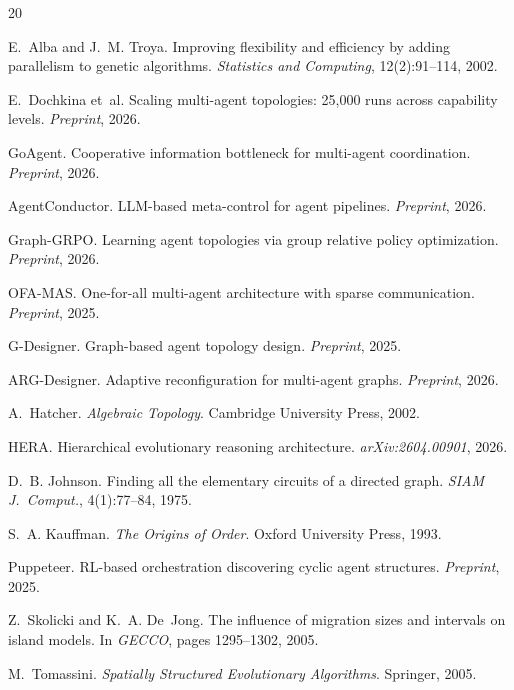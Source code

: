 \documentclass[10pt,twocolumn]{article}
\begin{document}

\begin{thebibliography}{20}

E.~Alba and J.~M. Troya.
\newblock Improving flexibility and efficiency by adding parallelism to genetic
  algorithms.
\newblock \emph{Statistics and Computing}, 12(2):91--114, 2002.

E.~Dochkina et~al.
\newblock Scaling multi-agent topologies: 25,000 runs across capability levels.
\newblock \emph{Preprint}, 2026.

GoAgent.
\newblock Cooperative information bottleneck for multi-agent coordination.
\newblock \emph{Preprint}, 2026.

AgentConductor.
\newblock LLM-based meta-control for agent pipelines.
\newblock \emph{Preprint}, 2026.

Graph-GRPO.
\newblock Learning agent topologies via group relative policy optimization.
\newblock \emph{Preprint}, 2026.

OFA-MAS.
\newblock One-for-all multi-agent architecture with sparse communication.
\newblock \emph{Preprint}, 2025.

G-Designer.
\newblock Graph-based agent topology design.
\newblock \emph{Preprint}, 2025.

ARG-Designer.
\newblock Adaptive reconfiguration for multi-agent graphs.
\newblock \emph{Preprint}, 2026.

A.~Hatcher.
\newblock \emph{Algebraic Topology}.
\newblock Cambridge University Press, 2002.

HERA.
\newblock Hierarchical evolutionary reasoning architecture.
\newblock \emph{arXiv:2604.00901}, 2026.

D.~B. Johnson.
\newblock Finding all the elementary circuits of a directed graph.
\newblock \emph{SIAM J.\ Comput.}, 4(1):77--84, 1975.

S.~A. Kauffman.
\newblock \emph{The Origins of Order}.
\newblock Oxford University Press, 1993.

Puppeteer.
\newblock RL-based orchestration discovering cyclic agent structures.
\newblock \emph{Preprint}, 2025.

Z.~Skolicki and K.~A. De~Jong.
\newblock The influence of migration sizes and intervals on island models.
\newblock In \emph{GECCO}, pages 1295--1302, 2005.

M.~Tomassini.
\newblock \emph{Spatially Structured Evolutionary Algorithms}.
\newblock Springer, 2005.

\end{thebibliography}
\end{document}
